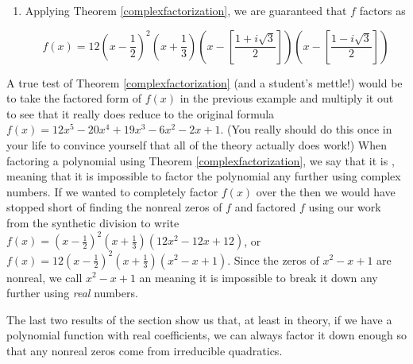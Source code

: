 {\begin{enumerate}
Our quotient is $12x^2 - 12x + 12$, whose zeros we find to be $\frac{1 \pm i \sqrt{3}}{2}$.  From Theorem \ref{complexfactorization}, we know $f$ has exactly $5$ zeros, counting multiplicities, and as such we have the zero $\frac{1}{2}$ with multiplicity $2$, and the zeros $-\frac{1}{3}$, $\frac{1 + i \sqrt{3}}{2}$ and $\frac{1 - i \sqrt{3}}{2}$, each of multiplicity $1$.

\item  Applying Theorem \ref{complexfactorization}, we are guaranteed that $f$ factors as

\[f(x) = 12 \left(x- \dfrac{1}{2}\right)^2 \left(x + \dfrac{1}{3}\right) \left(x - \left[\dfrac{1 + i \sqrt{3}}{2}\right]\right) \left(x - \left[\dfrac{1 - i \sqrt{3}}{2}\right]\right)\]

\end{enumerate}
}

A true test of Theorem \ref{complexfactorization} (and a student's mettle!) would be to take the factored form of $f(x)$ in the previous example and multiply it out  to see that it really does reduce to the original formula  $f(x) = 12x^5 - 20x^4+19x^3-6x^2-2x+1$. (You really should do this once in your life to convince yourself that all of the theory actually does work!) When factoring a polynomial using Theorem \ref{complexfactorization}, we say that it is  , meaning that it is impossible to factor the polynomial any further using complex numbers.  If we wanted to   completely factor $f(x)$ over the  then we would have stopped short of finding the nonreal zeros of $f$ and factored $f$ using our work from the synthetic division to write $f(x) = \left(x - \frac{1}{2} \right)^2 \left(x + \frac{1}{3} \right)\left(12x^2 - 12x + 12\right)$, or $f(x) = 12\left(x - \frac{1}{2} \right)^2 \left(x + \frac{1}{3} \right)\left(x^2 - x + 1\right)$.  Since the zeros of $x^2-x+1$ are nonreal, we call $x^2-x+1$ an  meaning it is impossible to break it down any further using \emph{real} numbers.  

\smallskip

The last two results of the section show us that, at least in theory, if we have a polynomial function with real coefficients, we can always factor it down enough so that any nonreal zeros come from irreducible quadratics.

